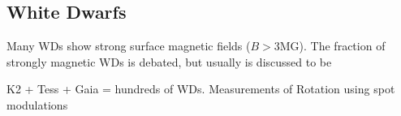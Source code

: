 {\color{red} \subsection{White Dwarfs}}
Many WDs show strong surface magnetic fields ($B>$3MG). The fraction of strongly magnetic WDs is debated, but usually is discussed to be  

K2 + Tess + Gaia = hundreds of WDs. Measurements of Rotation using spot modulations